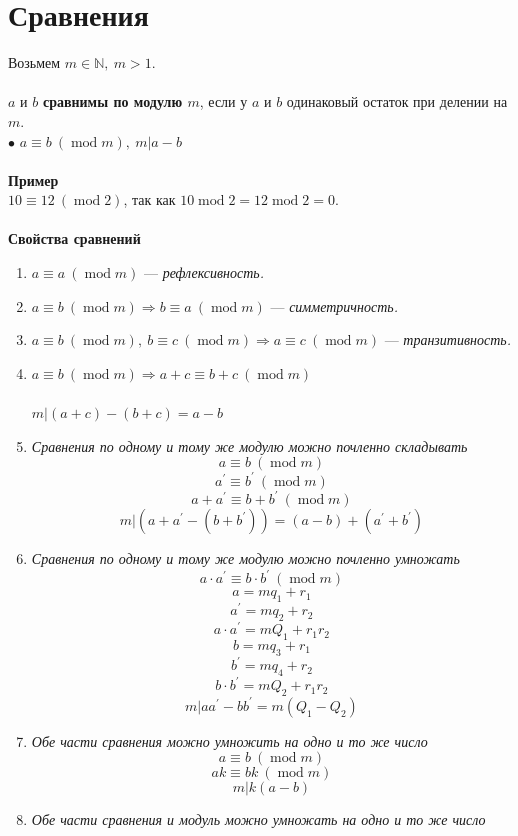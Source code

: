 \documentclass[a4paper, 12pt]{article}
\renewcommand{\mod}{\operatorname{mod}}
\newcommand{\N}{\mathbb{N}}
\begin{document}
    \section{Сравнения}
    Возьмем $m \in \N, \ m>1$.\\\\
    $a$ и $b$ \textbf{сравнимы по модулю $m$}, если у $a$ и $b$ одинаковый остаток при делении на $m$.\\
    $\bullet$ $a \equiv b \ (\mod m), \ m|a-b$\\\\
    \textbf{Пример}\\
    $10 \equiv 12 \ (\mod 2)$,
    так как $10 \mod 2 = 12 \mod 2 = 0$.\\\\
    \textbf{Свойства сравнений}
    \begin{enumerate}
        \item $a \equiv a \ (\mod m)$ --- \textit{рефлексивность.}
        \item $a \equiv b \ (\mod m) \Rightarrow b \equiv a \ (\mod m)$ --- \textit{симметричность.}
        \item $a \equiv b \ (\mod m), \ b \equiv c \ (\mod m) \Rightarrow a \equiv c \ (\mod m)$ --- \textit{транзитивность.}
        \item  $a \equiv b \ (\mod m) \Rightarrow a+c \equiv b+c \ (\mod m)$\\\\
        $m|(a+c)-(b+c)=a-b$
        \item \textit{Сравнения по одному и тому же модулю можно почленно складывать}\\
        $$a \equiv b \ (\mod m)$$
        $$a^\prime \equiv b^\prime \ (\mod m)$$
        $$a+a^\prime \equiv b+b^\prime \ (\mod m)$$
        $$m|(a+a^\prime-(b+b^\prime))=(a-b)+(a^\prime+b^\prime)$$
        \item \textit{Сравнения по одному и тому же модулю можно почленно умножать}
        $$a\cdot a^\prime \equiv b \cdot b^\prime \ (\mod m)$$
        $$a=mq_1+r_1$$
        $$a^\prime=mq_2+r_2$$
        $$a\cdot a^\prime = mQ_1+r_1r_2$$
        $$b=mq_3+r_1$$
        $$b^\prime=mq_4+r_2$$
        $$b\cdot b^\prime = mQ_2+r_1r_2$$
        $$m|aa^\prime-bb^\prime=m(Q_1-Q_2)$$
        \item \textit{Обе части сравнения можно умножить на одно и то же число}
        $$a \equiv b \ (\mod m)$$
        $$ak \equiv bk \ (\mod m)$$
        $$m|k(a-b)$$
        \item \textit{Обе части сравнения и модуль можно умножать на одно и то же число}

\end{enumerate}
\end{document}
